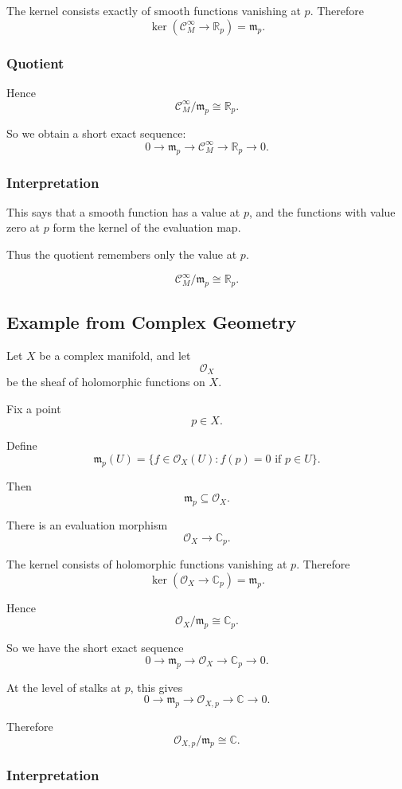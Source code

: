 \documentclass[12pt,a4paper]{article}
\newcommand{\RR}{\mathbb{R}}
\newcommand{\Cinfty}{\mathcal C^\infty}
\newcommand{\CC}{\mathbb{C}}
\newcommand{\OO}{\mathcal{O}}
\theoremstyle{notespace}
\begin{document}
The kernel consists exactly of smooth functions vanishing at \(p\). Therefore
\[
\ker(\Cinfty_M\to \RR_p)=\mathfrak m_p.
\]

\subsubsection*{Quotient}

Hence
\[
\Cinfty_M/\mathfrak m_p\cong \RR_p.
\]

So we obtain a short exact sequence:
\[
0\to \mathfrak m_p
\to \Cinfty_M
\to \RR_p
\to 0.
\]

\subsubsection*{Interpretation}

This says that a smooth function has a value at \(p\), and the functions with value zero at \(p\) form the kernel of the evaluation map.

Thus the quotient remembers only the value at \(p\).

\[
\boxed{
	\Cinfty_M/\mathfrak m_p\cong \RR_p.
}
\]

\subsection{Example from Complex Geometry}

Let \(X\) be a complex manifold, and let
\[
\OO_X
\]
be the sheaf of holomorphic functions on \(X\).

Fix a point
\[
p\in X.
\]

Define
\[
\mathfrak m_p(U)
=
\{f\in \OO_X(U): f(p)=0 \text{ if }p\in U\}.
\]

Then
\[
\mathfrak m_p\subseteq \OO_X.
\]

There is an evaluation morphism
\[
\OO_X\to \CC_p.
\]

The kernel consists of holomorphic functions vanishing at \(p\). Therefore
\[
\ker(\OO_X\to \CC_p)=\mathfrak m_p.
\]

Hence
\[
\OO_X/\mathfrak m_p\cong \CC_p.
\]

So we have the short exact sequence
\[
0\to \mathfrak m_p
\to \OO_X
\to \CC_p
\to 0.
\]

At the level of stalks at \(p\), this gives
\[
0\to \mathfrak m_p
\to \OO_{X,p}
\to \CC
\to 0.
\]

Therefore
\[
\OO_{X,p}/\mathfrak m_p\cong \CC.
\]

\subsubsection*{Interpretation}
\end{document}
